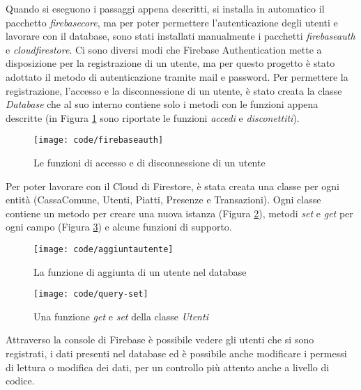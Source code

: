 Quando si eseguono i passaggi appena descritti, si installa in automatico il pacchetto \emph{firebase\textunderscore core}, ma per poter permettere l'autenticazione degli utenti e lavorare con il database, sono stati installati manualmente i pacchetti \emph{firebase\textunderscore auth} e \emph{cloud\textunderscore firestore}.\newline
\newline
Ci sono diversi modi che Firebase Authentication mette a disposizione per la registrazione di un utente, ma per questo progetto è stato adottato il metodo di autenticazione tramite mail e password.\newline
Per permettere la registrazione, l'accesso e la disconnessione di un utente, è stato creata la classe \emph{Database} che al suo interno contiene solo i metodi con le funzioni appena descritte (in Figura \ref{fig:code-authentication} sono riportate le funzioni \emph{accedi} e \emph{disconettiti}).
\begin{figure}[!h] 
    \centering 
    \texttt{[image: code/firebaseauth]} 
    \caption{Le funzioni di accesso e di disconnessione di un utente}
    \label{fig:code-authentication}
\end{figure}

\newpage

Per poter lavorare con il Cloud di Firestore, è stata creata una classe per ogni entità (CassaComune, Utenti, Piatti, Presenze e Transazioni).\newline
Ogni classe contiene un metodo per creare una nuova istanza (Figura \ref{fig:code-aggiungi}), metodi \emph{set} e \emph{get} per ogni campo (Figura \ref{fig:code-query}) e alcune funzioni di supporto.
\begin{figure}[!h] 
    \centering 
    \texttt{[image: code/aggiuntautente]} 
    \caption{La funzione di aggiunta di un utente nel database}
    \label{fig:code-aggiungi}
\end{figure}
\begin{figure}[!h] 
    \centering 
    \texttt{[image: code/query-set]} 
    \caption{Una funzione \emph{get} e \emph{set} della classe \emph{Utenti}}
    \label{fig:code-query}
\end{figure}

Attraverso la console di Firebase è possibile vedere gli utenti che si sono registrati, i dati presenti nel database ed è possibile anche modificare i permessi di lettura o modifica dei dati, per un controllo più attento anche a livello di codice. 

